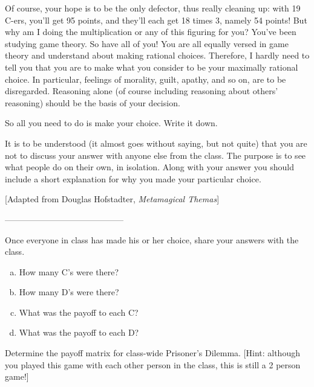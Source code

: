 Of course, your hope is to be the only defector, thus really cleaning up: with 19 C-ers, you'll get 95 points, and they'll each get 18 times 3, namely 54 points! But why am I doing the multiplication or any of this figuring for you? You've been studying game theory. So have all of you! You are all equally versed in game theory and understand about making rational choices. Therefore, I hardly need to tell you that you are to make what you consider to be your maximally rational choice. In particular, feelings of morality, guilt, apathy, and so on, are to be disregarded. Reasoning alone (of course including reasoning about others' reasoning) should be the basis of your decision.

So all you need to do is make your choice. Write it down.

It is to be understood (it almost goes without saying, but not quite) that you are not to discuss your answer with anyone else from the class. The purpose is to see what people do on their own, in isolation. Along with your answer you should include a short explanation for why you made your particular choice.





[Adapted from Douglas Hofstadter, \textit{Metamagical Themas}]

------------------------------------------

\break

\begin{xca}\label{E:CWPDsummary}
Once everyone in class has made his or her choice, share your answers with the class.
\begin{enumerate}[(a)]
\item How many C's were there?
\item How many D's were there?
\item What was the payoff to each C?
\item What was the payoff to each D?
\end{enumerate}
\end{xca}

\begin{xca}\label{E:CWPDmatrix}
Determine the payoff matrix for class-wide Prisoner's Dilemma. [Hint: although you played this game with each other person in the class, this is still a 2 person game!]
\end{xca}

